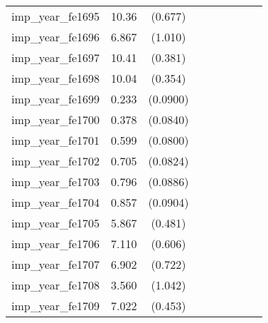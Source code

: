 {\begin{tabular}{l*{4}{cc}}
imp\_year\_fe1695&    10.36\sym{***}&  (0.677)&                  &         &                  &         &                  &         \\
imp\_year\_fe1696&    6.867\sym{***}&  (1.010)&                  &         &                  &         &                  &         \\
imp\_year\_fe1697&    10.41\sym{***}&  (0.381)&                  &         &                  &         &                  &         \\
imp\_year\_fe1698&    10.04\sym{***}&  (0.354)&                  &         &                  &         &                  &         \\
imp\_year\_fe1699&    0.233\sym{**} & (0.0900)&                  &         &                  &         &                  &         \\
imp\_year\_fe1700&    0.378\sym{***}& (0.0840)&                  &         &                  &         &                  &         \\
imp\_year\_fe1701&    0.599\sym{***}& (0.0800)&                  &         &                  &         &                  &         \\
imp\_year\_fe1702&    0.705\sym{***}& (0.0824)&                  &         &                  &         &                  &         \\
imp\_year\_fe1703&    0.796\sym{***}& (0.0886)&                  &         &                  &         &                  &         \\
imp\_year\_fe1704&    0.857\sym{***}& (0.0904)&                  &         &                  &         &                  &         \\
imp\_year\_fe1705&    5.867\sym{***}&  (0.481)&                  &         &                  &         &                  &         \\
imp\_year\_fe1706&    7.110\sym{***}&  (0.606)&                  &         &                  &         &                  &         \\
imp\_year\_fe1707&    6.902\sym{***}&  (0.722)&                  &         &                  &         &                  &         \\
imp\_year\_fe1708&    3.560\sym{***}&  (1.042)&                  &         &                  &         &                  &         \\
imp\_year\_fe1709&    7.022\sym{***}&  (0.453)&                  &         &                  &         &                  &         \\

\end{tabular}}
